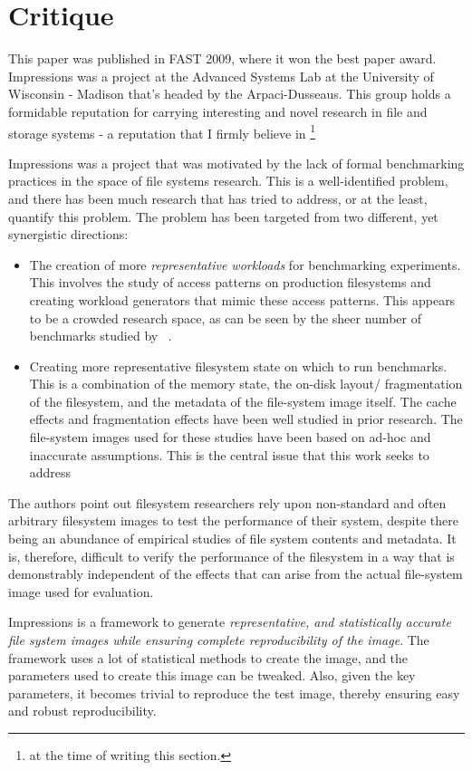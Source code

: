 \section{Critique}
This paper was published in FAST 2009, where it won the best paper award. Impressions was a project at the Advanced Systems Lab at the University of Wisconsin - Madison that's headed by the Arpaci-Dusseaus. This group holds a formidable reputation for carrying interesting and novel research in file and storage systems - a reputation that I firmly believe in \footnote{at the time of writing this section.}

Impressions was a project that was motivated by the lack of formal benchmarking practices in the space of file systems research. This is a well-identified problem, and there has been much research that has tried to address, or at the least, quantify this problem. The problem has been targeted from two different, yet synergistic directions:
\begin{itemize}
\item The creation of more \emph{representative workloads} for benchmarking experiments. This involves the study of access patterns on production filesystems and creating workload generators that mimic these access patterns. This appears to be a crowded research space, as can be seen by the sheer number of benchmarks studied by ~\cite{tarasov2011benchmarking}.
\item Creating more representative filesystem state on which to run benchmarks. This is a combination of the memory state, the on-disk layout/ fragmentation of the filesystem, and the metadata of the file-system image itself. The cache effects and fragmentation effects have been well studied in prior research. The file-system images used for these studies have been based on ad-hoc and inaccurate assumptions. This is the central issue that this work seeks to address
\end{itemize}

The authors point out filesystem researchers rely upon non-standard and often arbitrary filesystem images to test the performance of their system, despite there being an abundance of empirical studies of file system contents and metadata. It is, therefore, difficult to verify the performance of the filesystem in a way that is demonstrably independent of the effects that can arise from the actual file-system image used for evaluation.

Impressions is a framework to generate \emph{representative, and statistically accurate file system images while ensuring complete reproducibility of the image}. The framework uses a lot of statistical methods to create the image, and the parameters used to create this image can be tweaked. Also, given the key parameters, it becomes trivial to reproduce the test image, thereby ensuring easy and robust reproducibility.


